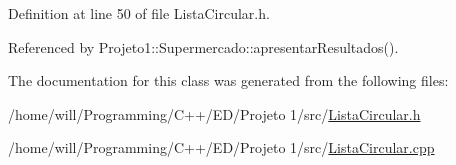 Definition at line 50 of file ListaCircular.h.



Referenced by Projeto1::Supermercado::apresentarResultados().



The documentation for this class was generated from the following files:\begin{DoxyCompactItemize}
\item 
/home/will/Programming/C++/ED/Projeto 1/src/\hyperlink{ListaCircular_8h}{ListaCircular.h}\item 
/home/will/Programming/C++/ED/Projeto 1/src/\hyperlink{ListaCircular_8cpp}{ListaCircular.cpp}\end{DoxyCompactItemize}
